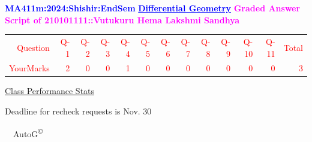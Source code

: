 \documentclass{article}                              %
\begin{document}
%
\vspace*{1in}

\begin{center}
	\textbf{\textcolor{blue}{\LARGE MA411m:2024:Shishir:EndSem}}
	\vskip 1cm
	\textbf{\textcolor{blue}{\underline{\Large Differential Geometry}}}
	\vskip 1cm
	\textbf{\textcolor{magenta}{\LARGE Graded Answer Script of 210101111::Vutukuru Hema Lakshmi Sandhya}}
\end{center}


\begin{center}
	\Huge 
	\textcolor{red}{
	\begin{tabular}{*{13}{r}}
		Question&Q-1& Q-2& Q-3& Q-4& Q-5& Q-6& Q-7& Q-8& Q-9& Q-10& Q-11&Total  \\
        	YourMarks&2&0&0&1&0&0&0&0&0&0&0&3
	\end{tabular}
	}
        \vskip 2cm
	\large
	\underline{Class Performance Stats}
	\DTLsetseparator{;}
	\begin{table}[htbp]
		\centering
	\end{table}
	\vskip 1cm
	Deadline for recheck requests is Nov. 30
\end{center}
\ \vfill \ \hfill \small AutoG\textsuperscript{\copyright}
\newpage
%
\end{document}
